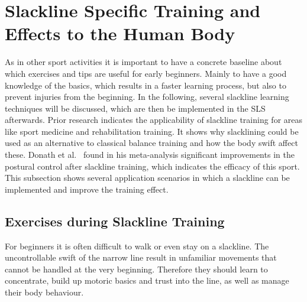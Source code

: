 \section{Slackline Specific Training and Effects to the Human Body}\label{2_2_slacklineTraining}

As in other sport activities it is important to have a concrete baseline about which exercises and tips are useful for early beginners.
Mainly to have a good knowledge of the basics, which results in a faster learning process, but also to prevent injuries from the beginning.
In the following, several slackline learning techniques will be discussed, which are then be implemented in the SLS afterwards.
Prior research indicates the applicability of slackline training for areas like sport medicine and rehabilitation training.
It shows why slacklining could be used as an alternative to classical balance training and how the body swift affect these.
Donath et al.~\cite{Donath2016-rt} found in his meta-analysis significant improvements in the postural control after slackline training, which indicates the efficacy of this sport.
This subsection shows several application scenarios in which a slackline can be implemented and improve the training effect.

\subsection{Exercises during Slackline Training}\label{2_1_1_slacklineTraining}

For beginners it is often difficult to walk or even stay on a slackline. The uncontrollable swift of the narrow line result in unfamiliar movements that cannot be handled at the very beginning. Therefore they should learn to concentrate, build up motoric basics and trust into the line, as well as manage their body behaviour.

